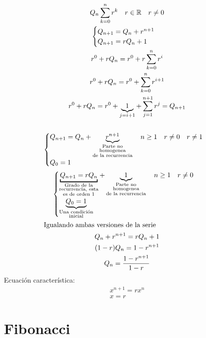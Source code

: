 \documentclass[../main.tex]{subfiles}
\begin{document}
\begin{gather*}
	Q_n
	\sum^n_{k=0} r^k\quad r\in\mathbb{R}\quad r\neq 0\\
	\begin{cases}
		Q_{n+1}=Q_n+r^{n+1}\\
		Q_{n+1}=rQ_n+1
	\end{cases}\\
	r^0+rQ_n= r^0+r
	\sum^n_{k=0} r^i\\
	r^0+rQ_n= r^0+
	\sum^n_{k=0} r^{i+1}\\
	r^0+rQ_n= r^0+
	\underbrace
	{1}_{j=i+1}+
	\sum^{n+1}_{j=1}r^j=Q_{n+1}\\
	\\
	\begin{cases}
		Q_{n+1} = Q_n+
		\underbrace
		{
			r^{n+1}
		}_{
			\substack
			{
				\text{Parte no}\\
				\text{homogenea}\\
				\text{de la recurrencia}
			}
		}
		\quad n\geq1\quad r\neq 0\quad r\neq 1\\
		Q_0=1
	\end{cases}\\
	\begin{cases}
		\underbracket
		{
			Q_{n+1} = rQ_n
		}_
		{
			\substack
			{
				\text{Grado de la}\\
				\text{recurrencia, esta}\\
				\text{es de orden $1$}
			}
		}
		+
		\underbrace
		{
			1
		}_
		{
			\substack
			{
				\text{Parte no}\\
				\text{homogenea}\\
				\text{de la recurrencia}
			}
		}
		\quad n \geq 1\quad r \neq 0\\
		\underbrace
		{
			Q_0=1
		}_
		{
			\substack
			{
				\text{Una condición}\\
				\text{inicial}
			}
		}
	\end{cases}\\
	\intertext{Igualando ambas versiones de la serie}
	Q_n+r^{n+1}=rQ_n+1\\
	(1-r)Q_n = 1-r^{n+1}\\
	Q_n =
	\frac{1-r^{n+1}}{1-r}
\end{gather*}
Ecuación característica:
\begin{gather*}
	x^{n+1}=rx^n\\
	x=r
\end{gather*}
\section{Fibonacci}%
\label{sec:Fibonacci}
\end{document}
